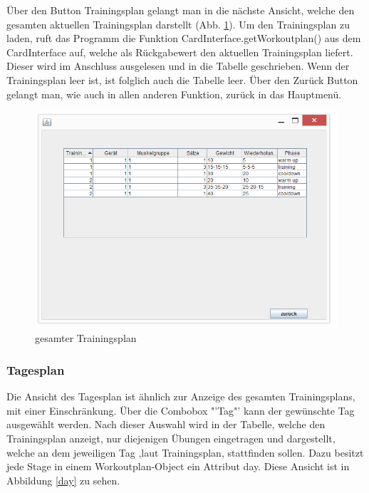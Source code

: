 Über den Button Trainingsplan gelangt man in die nächste Ansicht, welche den gesamten aktuellen Trainingsplan darstellt (Abb. \ref{main}). Um den Trainingsplan zu laden, ruft das Programm die Funktion CardInterface.getWorkoutplan() aus dem CardInterface auf, welche als Rückgabewert den aktuellen Trainingsplan liefert. Dieser wird im Anschluss ausgelesen und in die Tabelle geschrieben. Wenn der Trainingsplan leer ist, ist folglich auch die Tabelle leer. Über den Zurück Button gelangt man, wie auch in allen anderen Funktion, zurück in das Hauptmenü.

\begin{figure}[h]
\includegraphics[width=1\hsize]{./images/gesamt.png}
\caption{gesamter Trainingsplan}
\label{main}
\end{figure}
\newpage
\subsubsection*{Tagesplan}

Die Ansicht des Tagesplan ist ähnlich zur Anzeige des gesamten Trainingsplans, mit einer Einschränkung. Über die Combobox "'Tag"' kann der gewünschte Tag ausgewählt werden. Nach dieser Auswahl wird in der Tabelle, welche den Trainingsplan anzeigt, nur diejenigen Übungen eingetragen und dargestellt, welche an dem jeweiligen Tag ,laut Trainingsplan, stattfinden sollen. Dazu besitzt jede Stage in einem Workoutplan-Object ein Attribut day. Diese Ansicht ist in Abbildung \ref{day} zu sehen.

